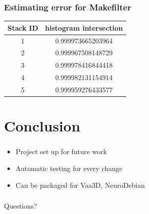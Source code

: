\documentclass{beamer}
\begin{document}
\begin{frame}\frametitle{Estimating error for Makefilter}
	\centering
	\begin{tabular}{cc}
		\toprule
                  \be{}Stack ID                              & \be{} histogram intersection \\
		\midrule
			1 & 0.999973665203964 \\
			2 & 0.999967508148729 \\
			3 & 0.999978416844418 \\
			4 & 0.999982131154914 \\
			5 & 0.999959276433577 \\
		\bottomrule
        \end{tabular}
\end{frame}

\section{Conclusion}
\begin{frame}\frametitle{\secname}
	\begin{itemize}
		\item<1-> Project set up for future work
		\item<2-> Automatic testing for every change
		\item<3-> Can be packaged for Vaa3D, NeuroDebian
	\end{itemize}
\end{frame}

\begin{frame}\frametitle{\secname}
	\centering\Huge Questions?
\end{frame}

\end{document}
